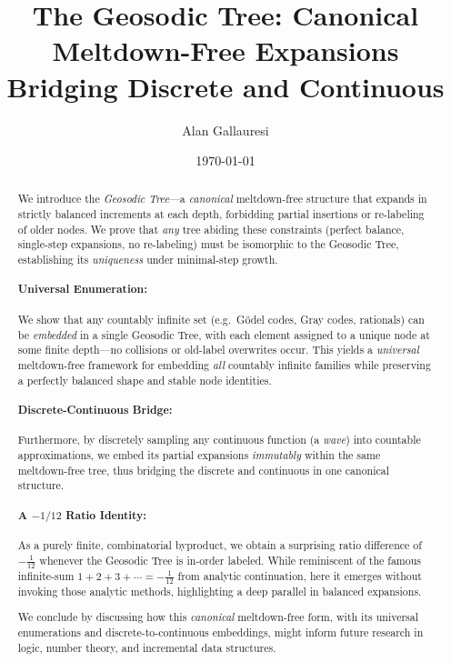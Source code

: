 \documentclass[acmsmall]{acmart}
\title{The Geosodic Tree: Canonical Meltdown-Free Expansions \\ Bridging Discrete and Continuous}
\author{Alan Gallauresi}
\affiliation{
  \institution{Independent Researcher}
  \city{College Park}
  \country{United States}
}
\date{\today}
\theoremstyle{definition}
\theoremstyle{remark}
\begin{document}
\maketitle

\begin{abstract}
    We introduce the \emph{Geosodic Tree}---a \emph{canonical} meltdown-free structure
    that expands in strictly balanced increments at each depth, forbidding partial
    insertions or re-labeling of older nodes. We prove that \emph{any} tree abiding
    these constraints (perfect balance, single-step expansions, no re-labeling)
    must be isomorphic to the Geosodic Tree, establishing its \emph{uniqueness}
    under minimal-step growth.

    \paragraph{Universal Enumeration:}
    We show that any countably infinite set (e.g.\ G\"odel codes, Gray codes, rationals)
    can be \emph{embedded} in a single Geosodic Tree, with each element assigned to
    a unique node at some finite depth---no collisions or old-label overwrites occur.
    This yields a \emph{universal} meltdown-free framework for embedding \emph{all}
    countably infinite families while preserving a perfectly balanced shape
    and stable node identities.

    \paragraph{Discrete-Continuous Bridge:}
    Furthermore, by discretely sampling any continuous function (a \emph{wave}) into
    countable approximations, we embed its partial expansions \emph{immutably} within
    the same meltdown-free tree, thus bridging the discrete and continuous in one
    canonical structure.

    \paragraph{A $-1/12$ Ratio Identity:}
    As a purely finite, combinatorial byproduct, we obtain a surprising ratio difference
    of $-\tfrac{1}{12}$ whenever the Geosodic Tree is in-order labeled. While reminiscent
    of the famous infinite-sum $1+2+3+\cdots=-\tfrac{1}{12}$ from analytic continuation,
    here it emerges without invoking those analytic methods, highlighting a deep
    parallel in balanced expansions.

    We conclude by discussing how this \emph{canonical} meltdown-free form, with
    its universal enumerations and discrete-to-continuous embeddings, might inform
    future research in logic, number theory, and incremental data structures.
\end{abstract}
\end{document}
